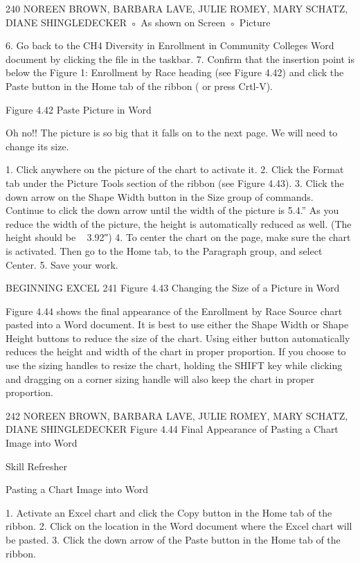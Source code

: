 240 NOREEN BROWN, BARBARA LAVE, JULIE ROMEY, MARY SCHATZ, DIANE SHINGLEDECKER
◦ As shown on Screen
◦ Picture

6. Go back to the CH4 Diversity in Enrollment in Community Colleges Word document by clicking the
file in the taskbar.
7. Confirm that the insertion point is below the Figure 1: Enrollment by Race heading (see Figure
4.42) and click the Paste button in the Home tab of the ribbon ( or press Crtl-V).




Figure 4.42 Paste Picture in Word


Oh no!! The picture is so big that it falls on to the next page. We will need to change its size.

1. Click anywhere on the picture of the chart to activate it.
2. Click the Format tab under the Picture Tools section of the ribbon (see Figure 4.43).
3. Click the down arrow on the Shape Width button in the Size group of commands. Continue to
click the down arrow until the width of the picture is 5.4.” As you reduce the width of the
picture, the height is automatically reduced as well. (The height should be ~ 3.92″)
4. To center the chart on the page, make sure the chart is activated. Then go to the Home tab, to
the Paragraph group, and select Center.
5. Save your work.




BEGINNING EXCEL 241
Figure 4.43 Changing the Size of a Picture in Word


Figure 4.44 shows the final appearance of the Enrollment by Race Source chart pasted into a Word
document. It is best to use either the Shape Width or Shape Height buttons to reduce the size of
the chart. Using either button automatically reduces the height and width of the chart in proper
proportion. If you choose to use the sizing handles to resize the chart, holding the SHIFT key while
clicking and dragging on a corner sizing handle will also keep the chart in proper proportion.




242 NOREEN BROWN, BARBARA LAVE, JULIE ROMEY, MARY SCHATZ, DIANE SHINGLEDECKER
Figure 4.44 Final Appearance of Pasting a Chart Image into Word




Skill Refresher


Pasting a Chart Image into Word

1. Activate an Excel chart and click the Copy button in the Home tab of the ribbon.
2. Click on the location in the Word document where the Excel chart will be pasted.
3. Click the down arrow of the Paste button in the Home tab of the ribbon.




